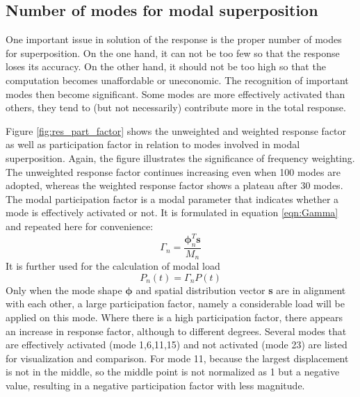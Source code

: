 \subsection{Number of modes for modal superposition}
One important issue in solution of the response is the proper number of modes for superposition. On the one hand, it can not be too few so that the response loses its accuracy. On the other hand, it should not be too high so that the computation becomes unaffordable or uneconomic. The recognition of important modes then become significant. Some modes are more effectively activated than others, they tend to (but not necessarily) contribute more in the total response. 

Figure \ref{fig:res_part_factor} shows the unweighted and weighted response factor as well as participation factor in relation to modes involved in modal superposition. Again, the figure illustrates the significance of frequency weighting. The unweighted response factor continues increasing even when 100 modes are adopted, whereas the weighted response factor shows a plateau after 30 modes. The modal participation factor is a modal parameter that indicates whether a mode is effectively activated or not. It is formulated in equation \ref{eqn:Gamma} and repeated here for convenience:
\begin{equation}
    \label{eqn:Gamma_1}
    \Gamma_n=\frac{\boldsymbol{\phi}_n^T\mathbf{s}}{M_n}
\end{equation}
\noindent
It is further used for the calculation of modal load
\begin{equation}
    P_n(t)=\Gamma_nP(t)
\end{equation}
\noindent
Only when the mode shape $\boldsymbol{\phi}$ and spatial distribution vector \textbf{s} are in alignment with each other, a large participation factor, namely a considerable load will be applied on this mode. Where there is a high participation factor, there appears an increase in response factor, although to different degrees. Several modes that are effectively activated (mode 1,6,11,15) and not activated (mode 23) are listed for visualization and comparison. For mode 11, because the largest displacement is not in the middle, so the middle point is not normalized as 1 but a negative value, resulting in a negative participation factor with less magnitude.

